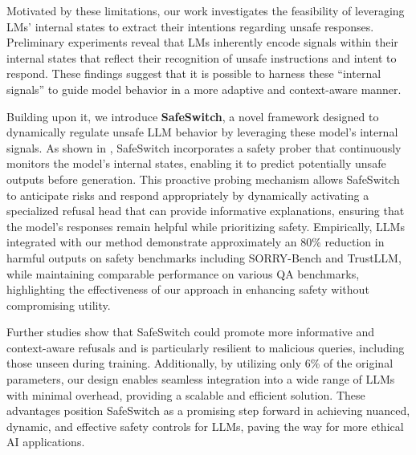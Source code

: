 Motivated by these limitations, our work investigates the feasibility of leveraging LMs’ internal states to extract their intentions regarding unsafe responses. Preliminary experiments reveal that LMs inherently encode signals within their internal states that reflect their recognition of unsafe instructions and intent to respond. These findings suggest that it is possible to harness these “internal signals” to guide model behavior in a more adaptive and context-aware manner.

Building upon it, we introduce \textbf{SafeSwitch}, a novel framework designed to dynamically regulate unsafe LLM behavior by leveraging these model’s internal signals. As shown in , SafeSwitch incorporates a safety prober that continuously monitors the model's internal states, enabling it to predict potentially unsafe outputs before generation. This proactive probing mechanism allows SafeSwitch to anticipate risks and respond appropriately by dynamically activating a specialized refusal head that can provide informative explanations, ensuring that the model’s responses remain helpful while prioritizing safety. Empirically, LLMs integrated with our method demonstrate approximately an 80\% reduction in harmful outputs on safety benchmarks including SORRY-Bench and TrustLLM, while maintaining comparable performance on various QA benchmarks, highlighting the effectiveness of our approach in enhancing safety without compromising utility.


Further studies show that SafeSwitch could promote more informative and context-aware refusals and is particularly resilient to malicious queries, including those unseen during training. Additionally, by utilizing only 6\% of the original parameters, our design enables seamless integration into a wide range of LLMs with minimal overhead, providing a scalable and efficient solution. These advantages position SafeSwitch as a promising step forward in achieving nuanced, dynamic, and effective safety controls for LLMs, paving the way for more ethical AI applications.



